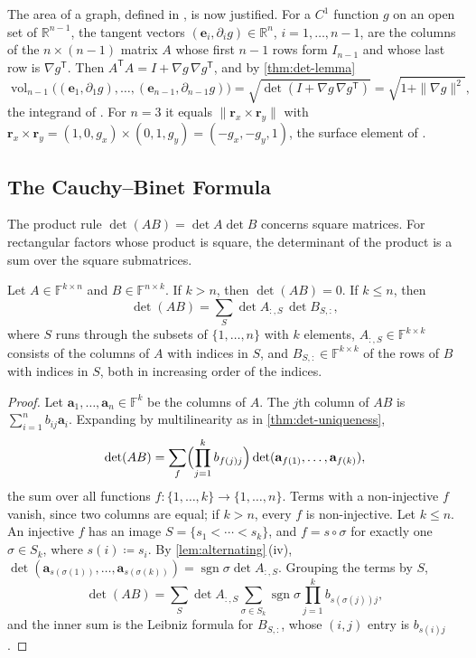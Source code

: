 The area of a graph, defined in , is now justified. For a $C^1$ function $g$ on an open set of $\mathbb R^{n-1}$, the tangent vectors $(\mathbf e_i,\partial_ig)\in\mathbb R^n$, $i=1,\ldots,n-1$, are the columns of the $n\times(n-1)$ matrix $A$ whose first $n-1$ rows form $I_{n-1}$ and whose last row is $\nabla g^{\mathsf T}$. Then $A^{\mathsf T}A=I+\nabla g\,\nabla g^{\mathsf T}$, and by \cref{thm:det-lemma}
\[
\operatorname{vol}_{n-1}\bigl((\mathbf e_1,\partial_1g),\ldots,(\mathbf e_{n-1},\partial_{n-1}g)\bigr)=\sqrt{\det(I+\nabla g\,\nabla g^{\mathsf T})}=\sqrt{1+\|\nabla g\|^2},
\]
the integrand of . For $n=3$ it equals $\|\mathbf r_x\times\mathbf r_y\|$ with $\mathbf r_x\times\mathbf r_y=(1,0,g_x)\times(0,1,g_y)=(-g_x,-g_y,1)$, the surface element of .

\subsection{The Cauchy--Binet Formula}

The product rule $\det(AB)=\det A\det B$ concerns square matrices. For rectangular factors whose product is square, the determinant of the product is a sum over the square submatrices.

\begin{theorem}
\label{thm:cauchy-binet}
Let $A\in\mathbb F^{k\times n}$ and $B\in\mathbb F^{n\times k}$. If $k>n$, then $\det(AB)=0$. If $k\le n$, then
\[
\det(AB)=\sum_{S}\det A_{:,S}\,\det B_{S,:},
\]
where $S$ runs through the subsets of $\{1,\ldots,n\}$ with $k$ elements, $A_{:,S}\in\mathbb F^{k\times k}$ consists of the columns of $A$ with indices in $S$, and $B_{S,:}\in\mathbb F^{k\times k}$ of the rows of $B$ with indices in $S$, both in increasing order of the indices.
\end{theorem}

\begin{proof}
Let $\mathbf a_1,\ldots,\mathbf a_n\in\mathbb F^k$ be the columns of $A$. The $j$th column of $AB$ is $\sum_{i=1}^nb_{ij}\mathbf a_i$. Expanding by multilinearity as in \cref{thm:det-uniqueness},
\[
\det(AB)=\sum_f\Bigl(\prod_{j=1}^kb_{f(j)j}\Bigr)\det(\mathbf a_{f(1)},\ldots,\mathbf a_{f(k)}),
\]
the sum over all functions $f\colon\{1,\ldots,k\}\to\{1,\ldots,n\}$. Terms with a non-injective $f$ vanish, since two columns are equal; if $k>n$, every $f$ is non-injective. Let $k\le n$. An injective $f$ has an image $S=\{s_1<\cdots<s_k\}$, and $f=s\circ\sigma$ for exactly one $\sigma\in S_k$, where $s(i)\coloneqq s_i$. By \cref{lem:alternating}\,(iv), $\det(\mathbf a_{s(\sigma(1))},\ldots,\mathbf a_{s(\sigma(k))})=\operatorname{sgn}\sigma\det A_{:,S}$. Grouping the terms by $S$,
\[
\det(AB)=\sum_S\det A_{:,S}\sum_{\sigma\in S_k}\operatorname{sgn}\sigma\prod_{j=1}^kb_{s(\sigma(j))j},
\]
and the inner sum is the Leibniz formula for $B_{S,:}$, whose $(i,j)$ entry is $b_{s(i)j}$.
\end{proof}

